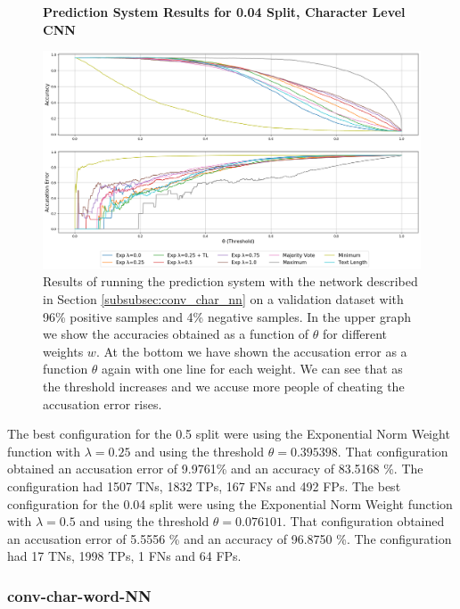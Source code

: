 \begin{figure}
    \centering
    \textbf{Prediction System Results for 0.04 Split, Character Level CNN}\par\medskip
    \includegraphics[scale=0.35]{./pictures/experiments/conv_char_nn/prediction_system_04.png}
    \caption{Results of running the prediction system with the network described
        in Section \ref{subsubsec:conv_char_nn} on a validation dataset with
        96\% positive samples and 4\% negative samples. In the upper graph we
        show the accuracies obtained as a function of $\theta$ for different
        weights $w$. At the bottom we have shown the accusation error as a
        function $\theta$ again with one line for each weight. We can see that
        as the threshold increases and we accuse more people of cheating the
        accusation error rises.}
    \label{fig:conv-char-NN-pred-4}
\end{figure}

The best configuration for the 0.5 split were using the Exponential Norm Weight
function with $\lambda = 0.25$ and using the threshold $\theta = 0.395398$.
That configuration obtained an accusation error of 9.9761\% and an accuracy of
83.5168 \%. The configuration had 1507 \gls{TN}s, 1832 \gls{TP}s, 167 \gls{FN}s
and 492 \gls{FP}s. The best configuration for the 0.04 split were using the
Exponential Norm Weight function with $\lambda = 0.5$ and using the threshold
$\theta = 0.076101$. That configuration obtained an accusation error of 5.5556
\% and an accuracy of 96.8750 \%. The configuration had 17 \gls{TN}s, 1998
\gls{TP}s, 1 \gls{FN}s and 64 \gls{FP}s.


\subsubsection{\glsdesc{conv-char-word-NN}}

